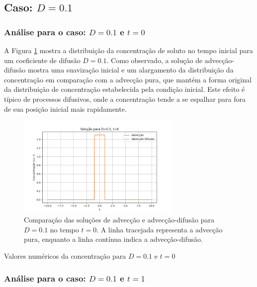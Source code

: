 
\subsection{Caso: \( D = 0.1 \)}

\subsubsection{Análise para o caso: \( D = 0.1 \) e \( t = 0 \)}

A Figura \ref{fig:advec_diffus_0.1_t0} mostra a distribuição da concentração de soluto no tempo inicial para um coeficiente de difusão \( D = 0.1 \). Como observado, a solução de advecção-difusão mostra uma suavização inicial e um alargamento da distribuição da concentração em comparação com a advecção pura, que mantém a forma original da distribuição de concentração estabelecida pela condição inicial. Este efeito é típico de processos difusivos, onde a concentração tende a se espalhar para fora de sua posição inicial mais rapidamente.

\begin{figure}[H]
    \centering
    \includegraphics[width=0.7\textwidth]{code/plot/Advec_Difus_t0_D0.1.png}
    \caption{Comparação das soluções de advecção e advecção-difusão para \( D = 0.1 \) no tempo \( t = 0 \). A linha tracejada representa a advecção pura, enquanto a linha contínua indica a advecção-difusão.}
    \label{fig:advec_diffus_0.1_t0}
\end{figure}


\begin{table}[H]
    \centering
    \caption{Valores numéricos da concentração para \( D = 0.1 \) e \( t = 0 \)}
    
\end{table}


\subsubsection{Análise para o caso: \( D = 0.1 \) e \( t = 1 \)}

